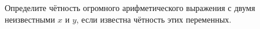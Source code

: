 Определите чётность
огромного арифметического выражения с двумя неизвестными $x$ и $y$, 
если известна чётность этих переменных.
